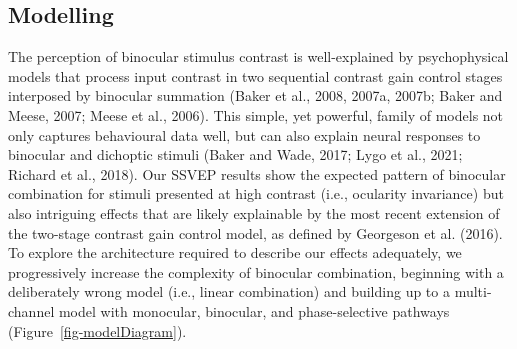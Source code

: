 \documentclass[review,
  12pt,
]{elsarticle}
\begin{document}
\subsection{Modelling}\label{modelling}

The perception of binocular stimulus contrast is well-explained by
psychophysical models that process input contrast in two sequential
contrast gain control stages interposed by binocular summation (Baker et
al., 2008, 2007a, 2007b; Baker and Meese, 2007; Meese et al., 2006).
This simple, yet powerful, family of models not only captures
behavioural data well, but can also explain neural responses to
binocular and dichoptic stimuli (Baker and Wade, 2017; Lygo et al.,
2021; Richard et al., 2018). Our SSVEP results show the expected pattern
of binocular combination for stimuli presented at high contrast (i.e.,
ocularity invariance) but also intriguing effects that are likely
explainable by the most recent extension of the two-stage contrast gain
control model, as defined by Georgeson et al. (2016). To explore the
architecture required to describe our effects adequately, we
progressively increase the complexity of binocular combination,
beginning with a deliberately wrong model (i.e., linear combination) and
building up to a multi-channel model with monocular, binocular, and
phase-selective pathways (Figure~\ref{fig-modelDiagram}).
\end{document}
